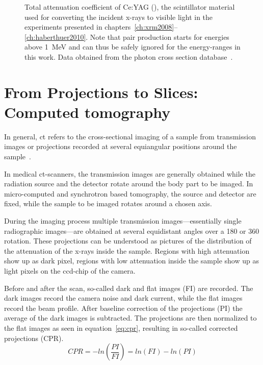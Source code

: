\def\width{\linewidth}%
\def\height{0.618\linewidth}%
\begin{figure}
	\noindent\makebox[\textwidth]{%
		\centering
		}
	\caption[Total attenuation coefficient of Ce:YAG]{Total attenuation coefficient of Ce:YAG (), the scintillator material used for converting the incident x-rays to visible light in the experiments presented in chapters~\ref{ch:xrm2008}--\ref{ch:haberthuer2010}. Note that pair production starts for energies above \SI{1}{\mega\electronvolt} and can thus be safely ignored for the energy-ranges in this work. Data obtained from the photon cross section database~\cite{XCOM}.}
	\label{fig:yag attenuation}
\end{figure}

\section{From Projections to Slices: Computed tomography}
In general, \ac{ct} refers to the cross-sectional imaging of a sample from transmission images or projections recorded at several equiangular positions around the sample~\cite{Kak2002}.

In medical \ac{ct}-scanners, the transmission images are generally obtained while the radiation source and the detector rotate around the body part to be imaged. In micro-computed and synchrotron based tomography, the source and detector are fixed, while the sample to be imaged rotates around a chosen axis.

During the imaging process multiple transmission images---essentially single radiographic images---are obtained at several equidistant angles over a \unit{180}{\degree} or \unit{360}{\degree} rotation. These projections can be understood as pictures of the distribution of the attenuation of the x-rays inside the sample. Regions with high attenuation show up as dark pixel, regions with low attenuation inside the sample show up as light pixels on the \ac{ccd}-chip of the camera.

Before and after the scan, so-called dark and flat images (FI) are recorded. The dark images record the camera noise and dark current, while the flat images record the beam profile. After baseline correction of the projections (PI) the average of the dark images is subtracted. The projections are then normalized to the flat images as seen in equation~\ref{eq:cpr}, resulting in so-called corrected projections (CPR).%
\begin{equation}%
	CPR=-ln\left(\frac{PI}{FI}\right)=ln(FI)-ln(PI)%
	\label{eq:cpr}%
\end{equation}%

